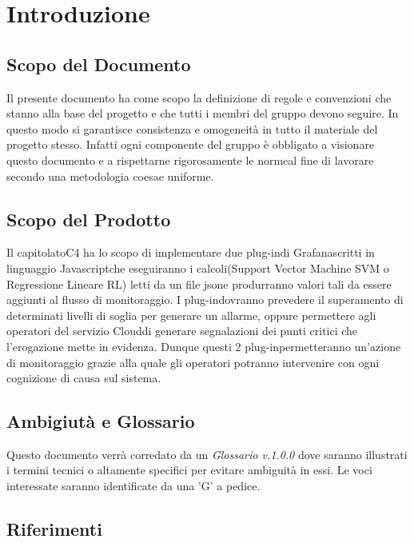 \section{Introduzione}
\subsection{Scopo del Documento}
Il presente documento ha come scopo la definizione di regole e convenzioni che stanno alla base del progetto e che tutti i membri del gruppo devono seguire. In questo modo si garantisce consistenza e omogeneità in tutto il materiale del progetto stesso. Infatti ogni componente del gruppo è obbligato a visionare questo documento e a rispettarne rigorosamente le norme\glosp al fine di lavorare secondo una metodologia coesa\glosp e uniforme.
\subsection{Scopo del Prodotto}
Il capitolato\glosp C4 ha lo scopo di implementare due plug-in\glosp di Grafana\glosp scritti in linguaggio Javascript\glosp che eseguiranno i calcoli(Support Vector Machine SVM o Regressione Lineare RL) letti da un file json\glosp e produrranno valori tali da essere aggiunti al flusso di monitoraggio. I plug-in\glosp dovranno prevedere il superamento di determinati livelli di soglia per generare un allarme, oppure permettere agli operatori del servizio Cloud\glosp di generare segnalazioni dei punti critici che l'erogazione mette in evidenza.
Dunque questi 2 plug-in\glosp permetteranno un'azione di monitoraggio grazie alla quale gli operatori potranno intervenire con ogni cognizione di causa sul sistema.
\subsection{Ambigiutà e Glossario}
Questo documento verrà corredato da un \textit{Glossario v.1.0.0} dove saranno illustrati i termini tecnici o altamente specifici per evitare ambiguità in essi. Le voci interessate saranno identificate da una 'G' a pedice.
\subsection{Riferimenti}
